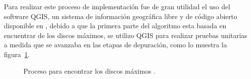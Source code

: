 Para realizar este proceso de implementación fue de gran utilidad el uso del software QGIS, un 
sistema de información geográfica libre y de código abierto disponible en \cite{QGISsoftware}, 
debido a que la primera parte del algoritmo esta basada en encuentrar de los discos máximos, se 
utilizo QGIS para realizar pruebas unitarias a medida que se avanzaba en las etapas de 
depuración, como lo muestra la figura~\ref{fig:findMaximalDisk}.

\begin{figure}
  \centering
  \caption{Proceso para encontrar los discos máximos \cite{romero2011mining}.}
  \label{fig:findMaximalDisk}
\end{figure}


